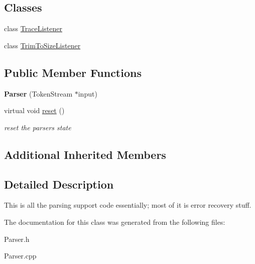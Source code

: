 \subsection*{Classes}
\begin{DoxyCompactItemize}
\item 
class \hyperlink{classantlr4_1_1Parser_1_1TraceListener}{Trace\+Listener}
\item 
class \hyperlink{classantlr4_1_1Parser_1_1TrimToSizeListener}{Trim\+To\+Size\+Listener}
\end{DoxyCompactItemize}
\subsection*{Public Member Functions}
\begin{DoxyCompactItemize}
\item 
\mbox{\label{classantlr4_1_1Parser_ae6d10e19e25f9476cfe4b1c1ed664b7f}} 
{\bfseries Parser} (Token\+Stream $\ast$input)
\item 
\mbox{\label{classantlr4_1_1Parser_af9229801acbc514a95c290833db99864}} 
virtual void \hyperlink{classantlr4_1_1Parser_af9229801acbc514a95c290833db99864}{reset} ()
\begin{DoxyCompactList}\small\item\em reset the parser\textquotesingle{}s state \end{DoxyCompactList}\end{DoxyCompactItemize}
\subsection*{Additional Inherited Members}


\subsection{Detailed Description}
This is all the parsing support code essentially; most of it is error recovery stuff. 

The documentation for this class was generated from the following files\+:\begin{DoxyCompactItemize}
\item 
Parser.\+h\item 
Parser.\+cpp\end{DoxyCompactItemize}

